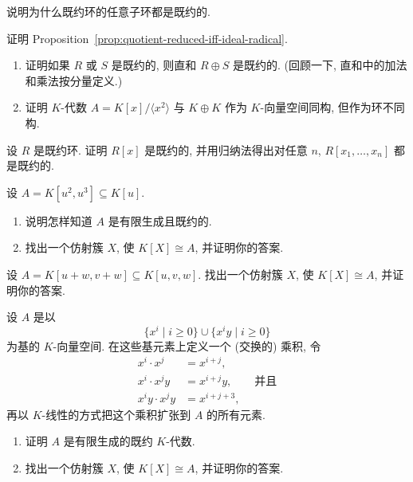 \BookExerciseHeading
\begin{BookExercises}
  \item\label{ex:subring-of-reduced-ring-is-reduced} 说明为什么既约环的任意子环都是既约的.
  \item\label{ex:prove-quotient-reduced-iff-ideal-radical} 证明 Proposition~\ref{prop:quotient-reduced-iff-ideal-radical}.
  \item\label{ex:direct-sums-and-reducedness}
    \begin{enumerate}[label=(\alph*)]
      \item 证明如果 $R$ 或 $S$ 是既约的, 则直和 $R\oplus S$ 是既约的. (回顾一下, 直和中的加法和乘法按分量定义.)
      \item 证明 $K$-代数 $A=K[x]/\langle x^{2}\rangle$ 与 $K\oplus K$ 作为 $K$-向量空间同构, 但作为环不同构.
    \end{enumerate}
  \item\label{ex:polynomial-rings-over-reduced-rings} 设 $R$ 是既约环. 证明 $R[x]$ 是既约的, 并用归纳法得出对任意 $n$, $R[x_{1},\ldots,x_{n}]$ 都是既约的.
  \item\label{ex:find-variety-of-subalgebra-square-cube} 设 $A=K[u^{2},u^{3}]\subseteq K[u]$.
    \begin{enumerate}[label=(\alph*)]
      \item 说明怎样知道 $A$ 是有限生成且既约的.
      \item 找出一个仿射簇 $X$, 使 $K[X]\cong A$, 并证明你的答案.
    \end{enumerate}
  \item\label{ex:find-affine-variety-of-linear-generators} 设 $A=K[u+w,v+w]\subseteq K[u,v,w]$. 找出一个仿射簇 $X$, 使 $K[X]\cong A$, 并证明你的答案.
  \item\label{ex:find-affine-variety-from-multiplication-table} 设 $A$ 是以
    \[
      \{x^{i}\mid i\geq0\}\cup\{x^{i}y\mid i\geq0\}
    \]
    为基的 $K$-向量空间. 在这些基元素上定义一个 (交换的) 乘积, 令
    \[
      \begin{aligned}
        x^{i}\cdot x^{j}&=x^{i+j},\\
        x^{i}\cdot x^{j}y&=x^{i+j}y,\qquad\text{并且}\\
        x^{i}y\cdot x^{j}y&=x^{i+j+3},
      \end{aligned}
    \]
    再以 $K$-线性的方式把这个乘积扩张到 $A$ 的所有元素.
    \begin{enumerate}[label=(\alph*)]
      \item 证明 $A$ 是有限生成的既约 $K$-代数.
      \item 找出一个仿射簇 $X$, 使 $K[X]\cong A$, 并证明你的答案.

\end{enumerate}
\end{BookExercises}
